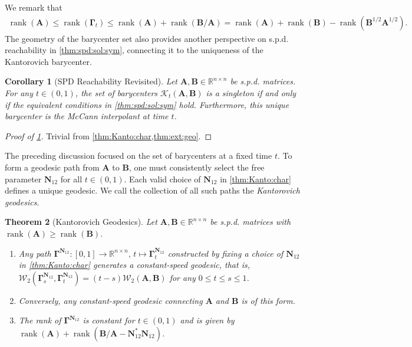 \documentclass[noinfoline]{imsart}\setcounter{tocdepth}{2}
\renewcommand{\b}[1]{\mathbb{#1}} %
\newcommand{\m}[1]{\mathbf{#1}} %
\renewcommand{\c}[1]{\mathcal{#1}} %
\DeclareMathOperator*{\rk}{rank}
\theoremstyle{plain}
\newtheorem{theorem}{Theorem}[section]
\newtheorem{corollary}[theorem]{Corollary}
\begin{document}
We remark that
\begin{align*}
    \rk(\m{A}) \le \rk(\m{\Gamma}_{t}) \le \rk(\m{A}) + \rk(\m{B}/\m{A}) = \rk(\m{A}) + \rk(\m{B}) - \rk(\m{B}^{1/2} \m{A}^{1/2}).
\end{align*}
The geometry of the barycenter set also provides another perspective on s.p.d. reachability in \cref{thm:spd:sol:sym}, connecting it to the uniqueness of the Kantorovich barycenter.

\begin{corollary}[SPD Reachability Revisited]\label{thm:spd:revise}
Let $\m{A}, \m{B}  \in \b{R}^{n \times n}$ be s.p.d. matrices. For any $t \in (0, 1)$, the set of barycenters $\c{K}_{t}(\m{A}, \m{B})$ is a singleton if and only if the equivalent conditions in \cref{thm:spd:sol:sym} hold.
Furthermore, this unique barycenter is the McCann interpolant at time $t$.
\end{corollary}
\begin{proof}[Proof of \cref{thm:spd:revise}]
Trivial from \cref{thm:Kanto:char,thm:ext:geo}.
\end{proof}


The preceding discussion focused on the set of barycenters at a fixed time $t$. To form a geodesic path from $\m{A}$ to $\m{B}$, one must consistently select the free parameter $\m{N}_{12}$ for all $t \in (0,1)$. Each valid choice of $\m{N}_{12}$ in \cref{thm:Kanto:char} defines a unique geodesic. We call the collection of all such paths the \emph{Kantorovich geodesics}.

\begin{theorem}[Kantorovich Geodesics]\label{thm:kanto:geo}
Let $\m{A}, \m{B}  \in \b{R}^{n \times n}$ be s.p.d. matrices with $\rk(\m{A}) \geq \rk(\m{B})$. 
\begin{enumerate}[leftmargin = *]
\item Any path $\m{\Gamma}^{\m{N}_{12}}: [0, 1] \to \b{R}^{n \times n}, \, t \mapsto \m{\Gamma}_{t}^{\m{N}_{12}}$ constructed by fixing a choice of $\m{N}_{12}$ in \cref{thm:Kanto:char} generates a constant-speed geodesic, that is, $\c{W}_{2}(\m{\Gamma}_{s}^{\m{N}_{12}}, \m{\Gamma}_{t}^{\m{N}_{12}}) = (t-s) \c{W}_{2}(\m{A}, \m{B})$ for any $0 \le t \le s \le 1$.
\item Conversely, any constant-speed geodesic connecting $\m{A}$ and $\m{B}$ is of this form.
\item The rank of $\m{\Gamma}^{\m{N}_{12}}$ is constant for $t \in (0, 1)$ and is given by $\rk(\m{A}) + \rk (\m{B}/\m{A} - \m{N}_{12}^{*} \m{N}_{12})$.
\end{enumerate}
\end{theorem}
\end{document}
